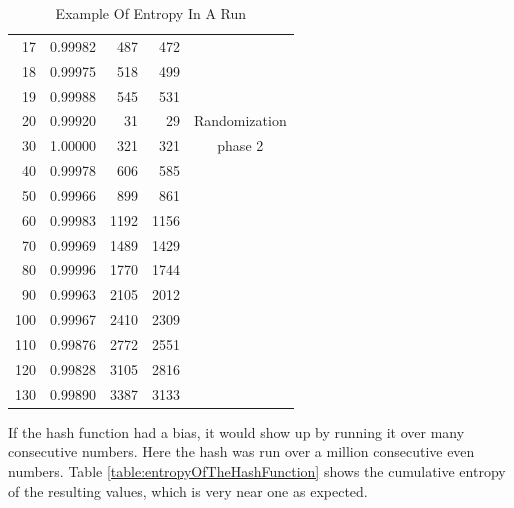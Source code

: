 \documentclass[preprint]{sigplanconf}
\begin{document}
\begin{table} [ht]
\begin{center}
\begin{tabular}{|r|r|r|r|c|}
            17            & 0.99982          & 487           & 472            &                \\
            18            & 0.99975          & 518           & 499            &                \\
            19            & 0.99988          & 545           & 531            &                \\
            \hline
            20            & 0.99920          & 31            & 29             & Randomization  \\
            30            & 1.00000          & 321           & 321            & phase 2        \\
            40            & 0.99978          & 606           & 585            &                \\
            50            & 0.99966          & 899           & 861            &                \\
            60            & 0.99983          & 1192          & 1156           &                \\
            70            & 0.99969          & 1489          & 1429           &                \\
            80            & 0.99996          & 1770          & 1744           &                \\
            90            & 0.99963          & 2105          & 2012           &                \\
            100           & 0.99967          & 2410          & 2309           &                \\
            110           & 0.99876          & 2772          & 2551           &                \\
            120           & 0.99828          & 3105          & 2816           &                \\
            130           & 0.99890          & 3387          & 3133           &                \\
            \hline
        \end{tabular}
        \caption{Example Of Entropy In A Run}
        \label{table:exampleOfEntropyInARun}
    \end{center}
\end{table}

\newpage

If the hash function had a bias, it would show up by running it over many consecutive numbers. Here the hash was run over a million consecutive even numbers. Table \ref{table:entropyOfTheHashFunction} shows the cumulative entropy of the resulting values, which is very near one as expected.
\end{document}
